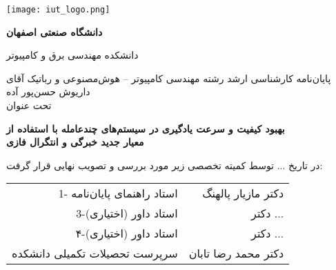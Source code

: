 \thispagestyle{empty}
\begin{center}
\texttt{[image: iut\_logo.png]}
\vspace{0.4cm}

\textbf{دانشگاه صنعتی اصفهان}\\
\vspace{0.4cm}

{\large
	دانشکده مهندسی برق و کامپیوتر
}
\vspace{1.8cm}

\vfill

{\Large
	پایان‌نامه کارشناسی ارشد رشته مهندسی کامپیوتر -- هوش‌مصنوعی و رباتیک آقای داریوش حسن‌پور آده\\
	\vspace{.3cm}
	تحت عنوان\\
}


\end{center}

\begin{center}
{\large
	\textbf{بهبود کیفیت و سرعت یادگیری در سیستم‌های چندعامله با استفاده از\\
	معیار جدید خبرگی و انتگرال فازی}
}
\end{center}
\vspace*{1.8cm}
در تاریخ ... توسط کمیته تخصصی زیر مورد بررسی و تصویب نهایی قرار گرفت:\\

{\normalsize
	
	\begin{tabular}{rr}
	\vspace*{.8cm}
	1- استاد راهنمای پایان‌نامه  & \hspace{2cm} دکتر مازیار پالهنگ \\
	\vspace{.8cm}
	3-استاد داور (اختیاری) &\hspace{2cm} دکتر ... \\
	\vspace{.8cm}
	۴-استاد داور (اختیاری) &\hspace{2cm} دکتر ... \\
	\vspace{.8cm}
	سرپرست تحصیلات تکمیلی دانشکده &\hspace{2cm} دکتر محمد رضا تابان \\
	\end{tabular}
}
\restoregeometry
\pagebreak

\thispagestyle{empty}
\vspace*{1.5cm}

